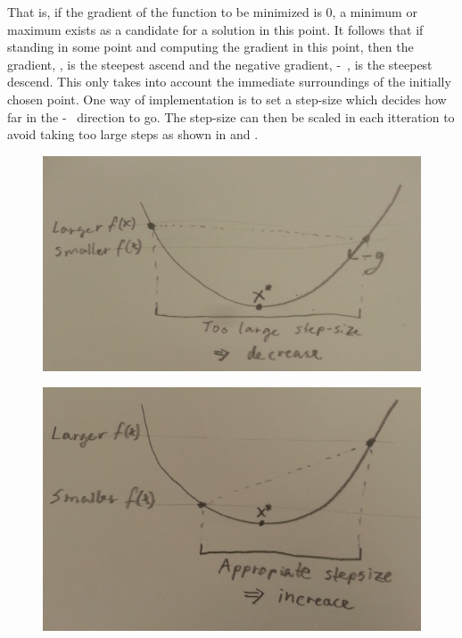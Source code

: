 That is, if the gradient of the function to be minimized is 0, a minimum or maximum exists as a candidate for a solution in this point. It follows that if standing in some point and computing the gradient in this point, then the gradient, \si{}, is the steepest ascend and the negative gradient, \si{-}, is the steepest descend. This only takes into account the immediate surroundings of the initially chosen point. One way of implementation is to set a step-size which decides how far in the \si{-} direction to go. The step-size can then be scaled in each itteration to avoid taking too large steps as shown in  and .
%
\begin{minipage}{\linewidth}
	\begin{minipage}{0.45\linewidth}
		\begin{figure}[H]
			\includegraphics[scale=.09]{figures/SteepestDescendLargeStep}
			\centering
			\captionsetup{justification=centering}
			\vspace{-.55cm}
			\label{SteepestDescendLargeStep}
		\end{figure}
	\end{minipage}
	\hspace{0.03\linewidth}
	\begin{minipage}{0.45\linewidth}
		\begin{figure}[H]
			\includegraphics[scale=.084]{figures/SteepestDescendSmallStep}

\end{figure}
\end{minipage}
\end{minipage}

